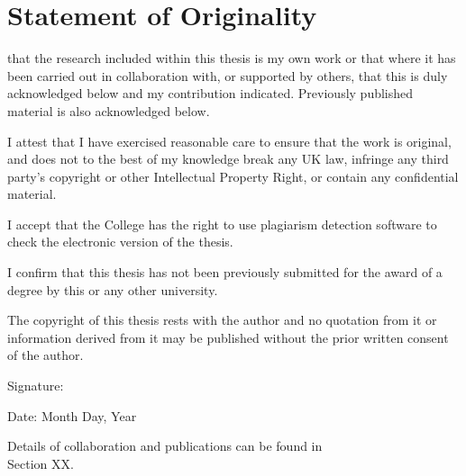 
\chapter*{Statement of Originality}

 that the research included within this thesis is my own work or that where it has been carried out in collaboration with, or supported by others, that this is duly acknowledged below and my contribution indicated. Previously published material is also acknowledged below.

I attest that I have exercised reasonable care to ensure that the work is original, and does not to the best of my knowledge break any UK law, infringe any third party's copyright or other Intellectual Property Right, or contain any confidential material.

I accept that the College has the right to use plagiarism detection software to check the electronic version of the thesis.

I confirm that this thesis has not been previously submitted for the award of a degree by this or any other university.

The copyright of this thesis rests with the author and no quotation from it or information derived from it may be published without the prior written consent of the author.

\vspace{5mm}

Signature:  

Date: Month Day, Year

\vspace{5mm}

Details of collaboration and publications can be found in \\ Section XX. %